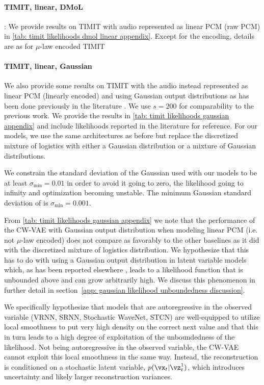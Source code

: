 {\paragraph{TIMIT, linear, DMoL}: We provide results on TIMIT with audio represented as linear PCM (raw PCM) in \cref{tab: timit likelihoods dmol linear appendix}. Except for the encoding, details are as for $\mu$-law encoded TIMIT

\paragraph{TIMIT, linear, Gaussian} We also provide some results on TIMIT with the audio instead represented as linear PCM (linearly encoded) and using Gaussian output distributions as has been done previously in the literature \parencite{chung_recurrent_2015, fraccaro_sequential_2016, lai_stochastic_2018, aksan_stcn_2019}. We use $s=200$ for comparability to the previous work. We provide the results in \cref{tab: timit likelihoods gaussian appendix} and include likelihoods reported in the literature for reference. For our models, we use the same architectures as before but replace the discretized mixture of logistics with either a Gaussian distribution or a mixture of Gaussian distributions. 

We constrain the standard deviation of the Gaussian used with our models to be at least $\sigma_\text{min} = 0.01$ in order to avoid it going to zero, the likelihood going to infinity and optimization becoming unstable. The minimum Gaussian standard deviation of \textcite{aksan_stcn_2019} is $\sigma_\text{min} = 0.001$.

From \cref{tab: timit likelihoods gaussian appendix} we note that the performance of the CW-VAE with Gaussian output distribution when modeling linear PCM (i.e. not $\mu$-law encoded) does not compare as favorably to the other baselines as it did with the discretized mixture of logistics distribution. We hypothesize that this has to do with using a Gaussian output distribution in latent variable models which, as has been reported elsewhere \parencite{mattei_leveraging_2018}, leads to a likelihood function that is unbounded above and can grow arbitrarily high. We discuss this phenomenon in further detail in section~\cref{app: gaussian likelihood unboundedness discussion}. 

We specifically hypothesize that models that are autoregressive in the observed variable (VRNN, SRNN, Stochastic WaveNet, STCN) are well-equipped to utilize local smoothness to put very high density on the correct next value and that this in turn leads to a high degree of exploitation of the unboundedness of the likelihood. Not being autoregressive in the observed variable, the CW-VAE cannot exploit this local smoothness in the same way. Instead, the reconstruction is conditioned on a stochastic latent variable, $p(\vx_t|\vz^1_t)$, which introduces uncertainty and likely larger reconstruction variances.


}
